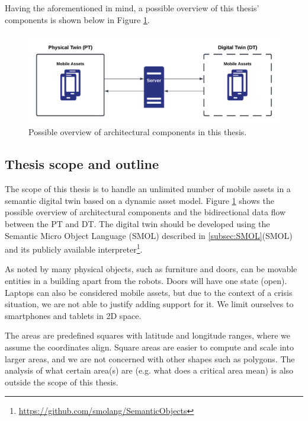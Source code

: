 \documentclass{article}
\begin{document}
Having the aforementioned in mind, a possible overview of this thesis' components is shown below in Figure \ref{fig:initial_components}.

\begin{figure}[H]
    \centering
    \includegraphics[scale=0.14]{graphics/initial_thesis_overview.png}
    \caption{Possible overview of architectural components in this thesis.}
    \label{fig:initial_components}
\end{figure}


\subsection{Thesis scope and outline}\label{subsec:Scope}
The scope of this thesis is to handle an unlimited number of mobile assets in a semantic digital twin based on a dynamic asset model. Figure \ref{fig:initial_components} shows the possible overview of architectural components and the bidirectional data flow between the PT and DT. The digital twin should be developed using the Semantic Micro Object Language (SMOL) described in \ref{subsec:SMOL}(SMOL) and its publicly available interpreter\footnote{\url{https://github.com/smolang/SemanticObjects}}.

As noted by \citeauthor{pauwels_live_2023} many physical objects, such as furniture and doors, can be movable entities in a building apart from the robots. Doors will have one state (open). Laptops can also be considered mobile assets, but due to the context of a crisis situation, we are not able to justify adding support for it. We limit ourselves to smartphones and tablets in 2D space.  

The areas are predefined squares with latitude and longitude ranges, where we assume the coordinates align. Square areas are easier to compute and scale into larger areas, and we are not concerned with other shapes such as polygons. The analysis of what certain area(s) are (e.g. what does a critical area mean) is also outside the scope of this thesis.
\end{document}
